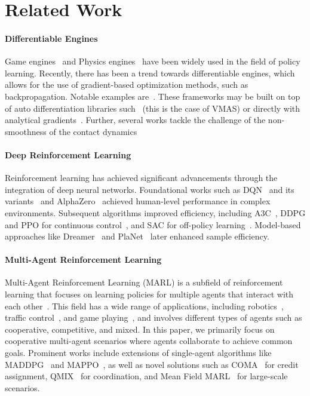 \section{Related Work}

\paragraph{Differentiable Engines}
Game engines~\cite{Bellemare13,Balla23} and Physics engines~\cite{Todorov12,Coumans16} have been widely used in the field of policy learning. Recently, there has been a trend towards differentiable engines, which allows for the use of gradient-based optimization methods, such as backpropagation. Notable examples are~\cite{Freeman21,Howell22,Genesis24}. These frameworks may be built on top of auto differentiation libraries such~\cite{Bradbury18,Ansel24} (this is the case of VMAS) or directly with analytical gradients~\cite{Carpentier18,Werling21}. Further, several works tackle the challenge of the non-smoothness of the contact dynamics~\cite{Degrave19,Moritz20}

\paragraph{Deep Reinforcement Learning}
Reinforcement learning has achieved significant advancements through the integration of deep neural networks.
Foundational works such as DQN~\cite{Mnih13} and its variants~\cite{Hessel18}
and AlphaZero~\cite{Silver17} achieved human-level performance in complex environments.
Subsequent algorithms improved efficiency, including A3C~\cite{Mnih16}, 
DDPG and PPO for continuous control~\cite{DBLP:journals/corr/LillicrapHPHETS15,Schulman17}, 
and SAC for off-policy learning~\cite{DBLP:conf/icml/HaarnojaZAL18}.
Model-based approaches like Dreamer~\cite{DBLP:conf/iclr/HafnerLB020} and PlaNet~\cite{DBLP:conf/icml/HafnerLFVHLD19} 
later enhanced sample efficiency.

\paragraph{Multi-Agent Reinforcement Learning}
Multi-Agent Reinforcement Learning (MARL) is a subfield of reinforcement learning that focuses on learning policies for multiple agents that interact with each other~\cite{albrecht2024multi}.
This field has a wide range of applications,
including robotics~\cite{DBLP:journals/air/ChungFYN24},
traffic control~\cite{DBLP:journals/tits/ChuWCL20},
and game playing~\cite{DBLP:conf/iclr/BakerKMWPMM20},
and involves different types of agents such as cooperative, competitive, and mixed.
In this paper, we primarily focus on cooperative multi-agent scenarios where agents collaborate to achieve common goals.
Prominent works include extensions of single-agent algorithms like MADDPG~\cite{DBLP:conf/nips/LoweWTHAM17} and MAPPO~\cite{DBLP:conf/nips/YuVVGWBW22},
as well as novel solutions such as COMA~\cite{DBLP:conf/aaai/FoersterFANW18} for credit assignment,
QMIX~\cite{DBLP:conf/icml/RashidSWFFW18} for coordination,
and Mean Field MARL~\cite{Yang18} for large-scale scenarios.


